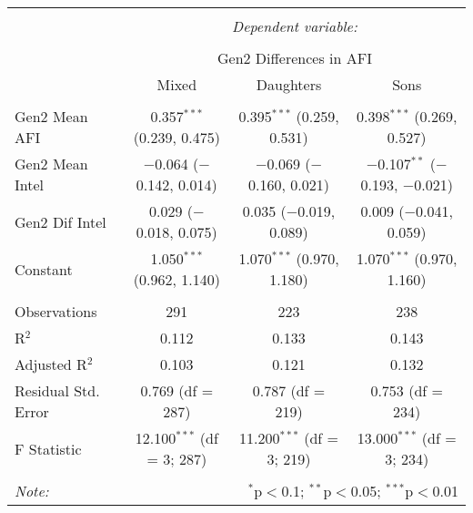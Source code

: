 
\begingroup 
\small 
\begin{tabular}{@{\extracolsep{1pt}}lccc} 
\\[-1.8ex]\hline 
\hline \\[-1.8ex] 
 & \multicolumn{3}{c}{\textit{Dependent variable:}} \\ 
\cline{2-4} 
\\[-1.8ex] & \multicolumn{3}{c}{Gen2 Differences in AFI} \\ 
 & Mixed & Daughters & Sons \\ 
\hline \\[-1.8ex] 
 Gen2 Mean AFI & 0.357$^{***}$ (0.239, 0.475) & 0.395$^{***}$ (0.259, 0.531) & 0.398$^{***}$ (0.269, 0.527) \\ 
  Gen2 Mean Intel & $-$0.064 ($-$0.142, 0.014) & $-$0.069 ($-$0.160, 0.021) & $-$0.107$^{**}$ ($-$0.193, $-$0.021) \\ 
  Gen2 Dif Intel & 0.029 ($-$0.018, 0.075) & 0.035 ($-$0.019, 0.089) & 0.009 ($-$0.041, 0.059) \\ 
  Constant & 1.050$^{***}$ (0.962, 1.140) & 1.070$^{***}$ (0.970, 1.180) & 1.070$^{***}$ (0.970, 1.160) \\ 
 \hline \\[-1.8ex] 
Observations & 291 & 223 & 238 \\ 
R$^{2}$ & 0.112 & 0.133 & 0.143 \\ 
Adjusted R$^{2}$ & 0.103 & 0.121 & 0.132 \\ 
Residual Std. Error & 0.769 (df = 287) & 0.787 (df = 219) & 0.753 (df = 234) \\ 
F Statistic & 12.100$^{***}$ (df = 3; 287) & 11.200$^{***}$ (df = 3; 219) & 13.000$^{***}$ (df = 3; 234) \\ 
\hline 
\hline \\[-1.8ex] 
\textit{Note:}  & \multicolumn{3}{r}{$^{*}$p$<$0.1; $^{**}$p$<$0.05; $^{***}$p$<$0.01} \\ 
\end{tabular} 
\endgroup 
